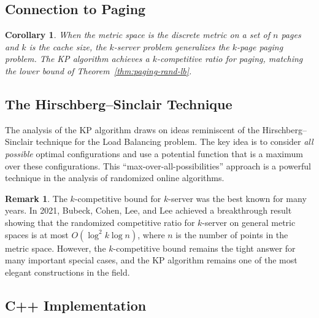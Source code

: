 \documentclass[twoside,12pt]{book}
\theoremstyle{plain}
\newtheorem{corollary}[theorem]{Corollary}
\theoremstyle{definition}
\newtheorem{remark}[theorem]{Remark}
\theoremstyle{remark}
\begin{document}
\subsection{Connection to Paging}

\begin{corollary}\label{cor:k-server-paging}
When the metric space is the discrete metric on a set of $n$ pages and
$k$ is the cache size, the $k$-server problem generalizes the $k$-page
paging problem.  The KP algorithm achieves a $k$-competitive ratio for
paging, matching the lower bound of Theorem~\ref{thm:paging-rand-lb}.
\end{corollary}

\subsection{The Hirschberg--Sinclair Technique}

The analysis of the KP algorithm draws on ideas reminiscent of the
Hirschberg--Sinclair technique for the {\sc Load Balancing} problem.
The key idea is to consider \emph{all possible} optimal configurations
and use a potential function that is a maximum over these configurations.
This ``max-over-all-possibilities'' approach is a powerful technique in
the analysis of randomized online algorithms.

\begin{remark}
The $k$-competitive bound for $k$-server was the best known for many
years.  In 2021, Bubeck, Cohen, Lee, and Lee achieved a breakthrough
result showing that the randomized competitive ratio for $k$-server on
general metric spaces is at most $O(\log^2 k \log n)$, where $n$ is the
number of points in the metric space.  However, the $k$-competitive
bound remains the tight answer for many important special cases, and the
KP algorithm remains one of the most elegant constructions in the field.
\end{remark}


\subsection*{C++ Implementation}


\end{document}
